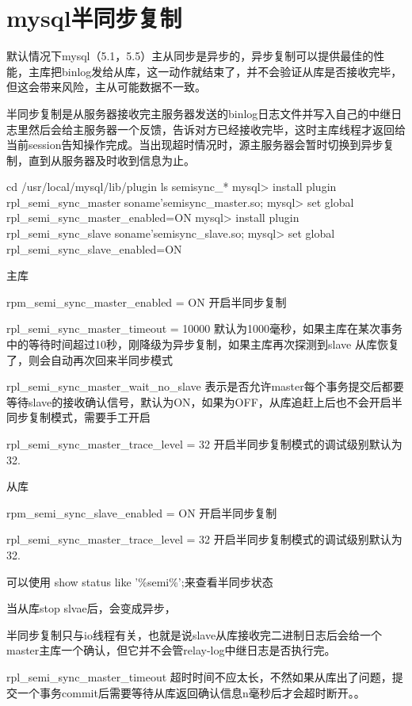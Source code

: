 \section{mysql半同步复制}
默认情况下mysql（5.1，5.5）主从同步是异步的，异步复制可以提供最佳的性能，主库把binlog发给从库，这一动作就结束了，并不会验证从库是否接收完毕，但这会带来风险，主从可能数据不一致。

半同步复制是从服务器接收完主服务器发送的binlog日志文件并写入自己的中继日志里然后会给主服务器一个反馈，告诉对方已经接收完毕，这时主库线程才返回给当前session告知操作完成。当出现超时情况时，源主服务器会暂时切换到异步复制，直到从服务器及时收到信息为止。

\begin{lsting}
cd /usr/local/mysql/lib/plugin
ls semisync_*
mysql> install plugin rpl_semi_sync_master soname'semisync_master.so;
mysql> set global rpl_semi_sync_master_enabled=ON
mysql> install plugin rpl_semi_sync_slave soname'semisync_slave.so;
mysql> set global rpl_semi_sync_slave_enabled=ON
\end{lsting}

主库

rpm_semi_sync_master_enabled = ON  开启半同步复制

rpl_semi_sync_master_timeout = 10000 默认为1000毫秒，如果主库在某次事务中的等待时间超过10秒，刚降级为异步复制，如果主库再次探测到slave 从库恢复了，则会自动再次回来半同步模式

rpl_semi_sync_master_wait_no_slave  表示是否允许master每个事务提交后都要等待slave的接收确认信号，默认为ON，如果为OFF，从库追赶上后也不会开启半同步复制模式，需要手工开启

rpl_semi_sync_master_trace_level = 32  开启半同步复制模式的调试级别默认为32.

从库

rpm_semi_sync_slave_enabled = ON  开启半同步复制

rpl_semi_sync_master_trace_level = 32  开启半同步复制模式的调试级别默认为32.


可以使用  show status like '\%semi\%';来查看半同步状态

当从库stop slvae后，会变成异步，

半同步复制只与io线程有关，也就是说slave从库接收完二进制日志后会给一个master主库一个确认，但它并不会管relay-log中继日志是否执行完。

rpl_semi_sync_master_timeout 超时时间不应太长，不然如果从库出了问题，提交一个事务commit后需要等待从库返回确认信息n毫秒后才会超时断开。。
